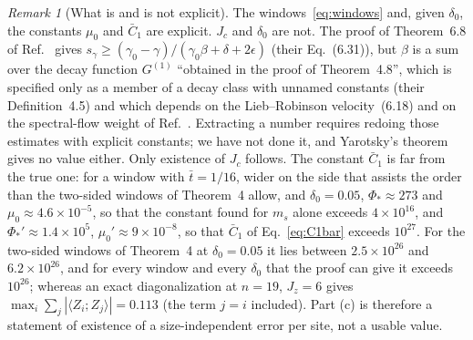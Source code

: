 \documentclass[aps,prx,onecolumn,10pt,nofootinbib,longbibliography,floatfix]{revtex4-2}
\theoremstyle{remark}
\newtheorem*{remark}{Remark}
\newcommand{\Jz}{J_z}
\newcommand{\ms}{m_s}
\begin{document}
\begin{remark}[What is and is not explicit]
The windows~\eqref{eq:windows} and, given $\delta_0$, the constants $\mu_0$ and $\bar C_1$ are explicit. $J_c$ and
$\delta_0$ are not. The proof of Theorem~6.8 of Ref.~\cite{nsy2022} gives %
$s_\gamma\ge(\gamma_0-\gamma)/(\gamma_0\beta+\delta+2\epsilon)$ (their Eq.~(6.31)), but $\beta$ is a sum over the %
decay function $G^{(1)}$ ``obtained in the proof of Theorem~4.8'', which is specified only as a member of a decay %
class with unnamed constants (their Definition~4.5) and which depends on the Lieb--Robinson velocity~(6.18) and on %
the spectral-flow weight of Ref.~\cite{nsy2019}. Extracting a number requires redoing those estimates with explicit
constants; we have not done it, and Yarotsky's theorem gives no value either. Only existence of $J_c$ follows. The
constant $\bar C_1$ is far from the true one: for a window with $\bar t=1/16$, wider on the side that assists the %
order than the two-sided windows of Theorem~4 allow, and $\delta_0=0.05$, $\Phi_*\approx273$ and %
$\mu_0\approx4.6\times10^{-5}$, so that the constant found for $\ms$ alone exceeds $4\times10^{16}$, and %
$\Phi_*'\approx1.4\times10^{5}$, $\mu_0'\approx9\times10^{-8}$, so that $\bar C_1$ of Eq.~\eqref{eq:C1bar} exceeds %
$10^{27}$. For the two-sided windows of Theorem~4 at $\delta_0=0.05$ it lies between $2.5\times10^{26}$ and %
$6.2\times10^{26}$, and for every window and every $\delta_0$ that the proof can give it exceeds $10^{26}$; whereas %
an exact diagonalization at $n=19$, $\Jz=6$ gives %
$\max_i\sum_j|\langle Z_i;Z_j\rangle|=0.113$ (the term $j=i$ included). Part (c) is therefore a statement of %
existence of a size-independent error per site, not a usable value.
\end{remark}
\end{document}
